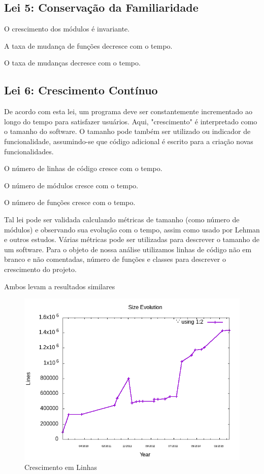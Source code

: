 \subsection{Lei 5: Conservação da Familiaridade}

\begin{hypothesis}
	O crescimento dos módulos é invariante.
\end{hypothesis}
\begin{hypothesis}
	A taxa de mudança de funções decresce com o tempo.
\end{hypothesis}
\begin{hypothesis}
	O taxa de mudanças decresce com o tempo.
\end{hypothesis}

\subsection{Lei 6: Crescimento Contínuo}
De acordo com esta lei, um programa deve ser constantemente incrementado ao longo do tempo para satisfazer usuários. Aqui, "crescimento" é interpretado como o tamanho do software. O tamanho pode também ser utilizado ou indicador de funcionalidade, assumindo-se que código adicional é escrito para a criação novas funcionalidades.
\begin{hypothesis}
	O número de linhas de código cresce com o tempo.
\end{hypothesis}
\begin{hypothesis}
	O número de módulos cresce com o tempo.
\end{hypothesis}
\begin{hypothesis}
	O número de funções cresce com o tempo.
\end{hypothesis}
Tal lei pode ser validada calculando métricas de tamanho (como número de módulos) e observando sua evolução com o tempo, assim como usado por Lehman e outros estudos. Várias métricas pode ser utilizadas para descrever o tamanho de um software. Para o objeto de nossa análise utilizamos linhas de código não em branco e não comentadas, número de funções e classes para descrever o crescimento do projeto.

Ambos levam a resultados similares
\begin{figure}
	\centering
	\includegraphics[width=0.7\linewidth]{figure/Lines}
	\caption{Crescimento em Linhas}
	\label{fig:lines}
\end{figure}


